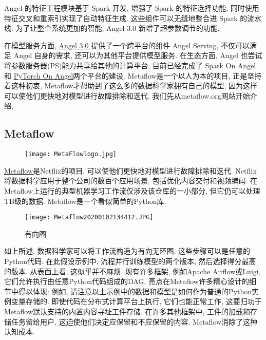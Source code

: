 Angel 的特征工程模块基于 Spark 开发, 增强了 Spark 的特征选择功能, 同时使用特征交叉和重索引实现了自动特征生成. 这些组件可以无缝地整合进 Spark 的流水线. 为了让整个系统更加的智能, Angel 3.0 新增了超参数调节的功能.

在模型服务方面, \href{https://github.com/Angel-ML}{Angel 3.0} 提供了一个跨平台的组件 Angel Serving, 不仅可以满足 Angel 自身的需求, 还可以为其他平台提供模型服务. 在生态方面, Angel 也尝试将参数服务器(PS)能力共享给其他的计算平台, 目前已经完成了 Spark On Angel 和 \href{https://github.com/zggl/PyTorch-On-Angel}{PyTorch On Angel}两个平台的建设.
Metaflow是一个以人为本的项目, 正是坚持着这种初衷, Metaflow才帮助到了这么多的数据科学家拥有自己的模型, 因为这样可以使他们更快地对模型进行故障排除和迭代.
我们先从metaflow.org网站开始介绍,
\subsection{Metaflow}
\begin{figure}[H]
\centering
\texttt{[image: MetaFlowlogo.jpg]}
\label{MetaFlowlogo}
\end{figure}
\href{metaflow.org}{Metaflow}是Netflix的项目, 可以使他们更快地对模型进行故障排除和迭代.
Netflix将数据科学应用于整个公司的数百个应用场景, 包括优化内容交付和视频编码.
在Metaflow上运行的典型机器学习工作流仅涉及该仓库的一小部分, 但它仍可以处理TB级的数据.
Metaflow是一个看似简单的Python库.
\begin{figure}[H]
\centering
\texttt{[image: Metaflow20200102134412.JPG]}
\caption{有向图}
\label{Metaflow20200102134412}
\end{figure}

如上所述, 数据科学家可以将工作流构造为有向无环图. 这些步骤可以是任意的Python代码. 在此假设示例中, 流程并行训练模型的两个版本, 然后选择得分最高的版本.
从表面上看, 这似乎并不麻烦. 现有许多框架, 例如Apache Airflow或Luigi, 它们允许执行由任意Python代码组成的DAG.
亮点在Metaflow许多精心设计的细节中得以体现: 例如, 请注意以上示例中的数据和模型是如何作为普通的Python实例变量存储的. 即使代码在分布式计算平台上执行, 它们也能正常工作, 这要归功于Metaflow默认支持的内置内容寻址工件存储. 在许多其他框架中, 工件的加载和存储任务留给用户, 这迫使他们决定应保留和不应保留的内容. Metaflow消除了这种认知成本.

